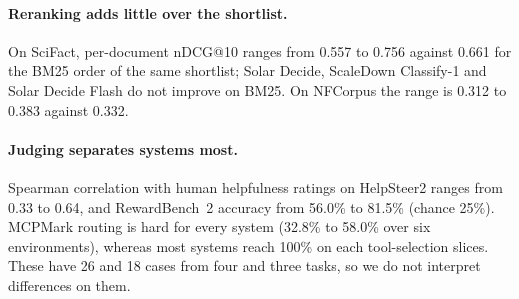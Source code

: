 \paragraph{Reranking adds little over the shortlist.} On SciFact, per-document
nDCG@10 ranges from 0.557 to 0.756 against 0.661 for the BM25 order of the same
shortlist; Solar Decide, ScaleDown Classify-1 and Solar Decide Flash do not
improve on BM25. On NFCorpus the range is 0.312 to 0.383 against 0.332.

\paragraph{Judging separates systems most.} Spearman correlation with human
helpfulness ratings on HelpSteer2 ranges from 0.33 to 0.64, and RewardBench~2
accuracy from 56.0\% to 81.5\% (chance 25\%). MCPMark routing is hard for every
system (32.8\% to 58.0\% over six environments), whereas most systems reach 100\% on each tool-selection
slices. These have 26 and 18 cases from four and three
tasks, so we do not interpret differences on them.
